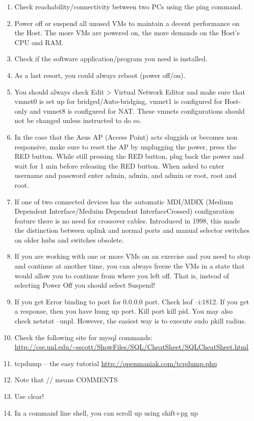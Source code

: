 \documentclass[main.tex]{subfiles}
\begin{document}
\begin{enumerate}[noitemsep,label=$\bullet$,leftmargin=16mm,labelsep=0.5cm]
\item{Check reachability/connectivity between two PCs using the ping command.}
\item{Power off or suspend all unused VMs to maintain a decent performance on the Host. The more VMs are powered on, the more demands on the Host's CPU and RAM.}
\item{Check if the software application/program you need is installed.}
\item{As a last resort, you could always reboot (power off/on).}
\item{You should always check Edit > Virtual Network Editor and make sure that vmnet0 is set up for bridged/Auto-bridging, vmnet1 is configured for Host-only and vmnet8 is configured for NAT.  These vmnets configurations should not be changed unless instructed to do so.}
\item{In the case that the Asus AP (Access Point) acts sluggish or becomes non responsive, make sure to reset the AP by unplugging the power, press the RED button.  While still pressing the RED button, plug back the power and wait for 1 min before releasing the RED button.  When asked to enter username and password enter admin, admin, and admin or root, root and root.}
\item{If one of two connected devices has the automatic MDI/MDI\-X (Medium Dependent Interface/Meduim Dependent Interface\-Crossed) configuration feature there is no need for crossover cables. Introduced in 1998, this made the distinction between uplink and normal ports and manual selector switches on older hubs and switches obsolete.}
\item{If you are working with one or more VMs on an exercise and you need to stop and continue at another time, you can always freeze the VMs in a state that would allow you to continue from where you left off. That is, instead of selecting Power Off you should select Suspend!}
\item{If you get Error binding to port for 0.0.0.0 port. Check lsof –i:1812. If you get a response, then you have hung up port. Kill port kill  pid.  You may also check netstat –unpl.  However, the easiest way is to execute sudo pkill  radius.}
\item{Check the following site for mysql commands:
\\
\url{http://cse.unl.edu/~sscott/ShowFiles/SQL/CheatSheet/SQLCheatSheet.html}}
\item{tcpdump – the easy tutorial \url{http://openmaniak.com/tcpdump.php}}
\item{Note that // means COMMENTS}
\item{Use clear!}
\item{In a command line shell, you can scroll up using shift+pg up}
\end{enumerate}
\end{document}
